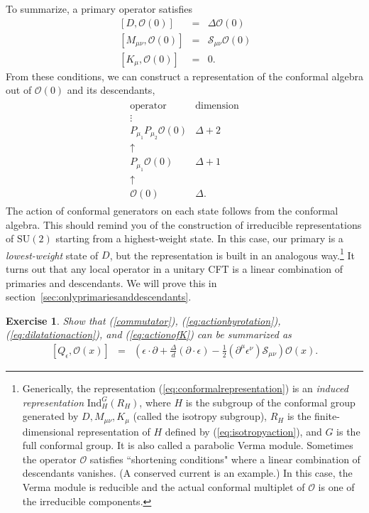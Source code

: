 \documentclass[11pt]{ws-rv9x6}
\newcommand\be{\begin{eqnarray}}
\newcommand\ee{\end{eqnarray}}
\newcommand\cO{\mathcal{O}}
\newcommand\p[1]{\left(#1\right)}
\newcommand\ptl\partial
\newcommand\e\epsilon
\newcommand\<\langle
\renewcommand\>\rangle
\newcommand\nn{\nonumber}
\renewcommand\.{\cdot}
\newcommand\De{\Delta}
\newcommand\cS{\mathcal{S}}
\newcommand\SU{\mathrm{SU}}
\newtheorem{exercise}{Exercise}[section]
\begin{document}
To summarize, a primary operator satisfies
\be
\label{eq:isotropyaction}
\,[D,\cO(0)] &=& \De\cO(0)\nn\\
\,[M_{\mu\nu},\cO(0)] &=& \cS_{\mu\nu}\cO(0)\nn\\
\,[K_\mu,\cO(0)] &=& 0.
\ee
From these conditions, we can construct a representation of the conformal algebra out of 
$\cO(0)$ and its descendants,
\be
\label{eq:conformalrepresentation}
\begin{array}{c|c}
\textrm{operator} & \textrm{dimension}
\\
\hline
\vdots & \\
P_{\mu_1}P_{\mu_2}\cO(0) & \De+2\\
\uparrow & \\
P_{\mu_1} \cO(0) & \De+1\\
\uparrow &\\
\cO(0) & \De.
\end{array}
\ee
The action of conformal generators on each state follows from the conformal algebra.  This should remind you of the construction of irreducible representations of $\SU(2)$ starting from a highest-weight state.  In this case, our primary is a {\it lowest-weight\/} state of $D$, but the representation is built in an analogous way.\footnote{Generically, the representation (\ref{eq:conformalrepresentation}) is an {\it induced representation} $\mathrm{Ind}^G_H(R_H)$, where $H$ is the subgroup of the conformal group generated by $D,M_{\mu\nu},K_\mu$ (called the isotropy subgroup), $R_H$ is the finite-dimensional representation of $H$ defined by (\ref{eq:isotropyaction}), and $G$ is the full conformal group. It is also called a parabolic Verma module.  Sometimes the operator $\cO$ satisfies ``shortening conditions" where a linear combination of descendants vanishes. (A conserved current is an example.)  In this case, the Verma module is reducible and the actual conformal multiplet of $\cO$ is one of the irreducible components.}  It turns out that any local operator in a unitary CFT is a linear combination of primaries and descendants. We will prove this in section~\ref{sec:onlyprimariesanddescendants}.

\begin{exercise}
Show that (\ref{commutator}), (\ref{eq:actionbyrotation}), (\ref{eq:dilatationaction}), and (\ref{eq:actionofK}) can be summarized as
\be
\label{eq:generatorsummary}
[Q_\e,\cO(x)] &=& \p{\e\.\ptl + \frac{\De}{d}(\ptl\.\e) - \frac 1 2 (\ptl^\mu \e^\nu)\cS_{\mu\nu}}\cO(x).
\ee
\end{exercise}
\end{document}
